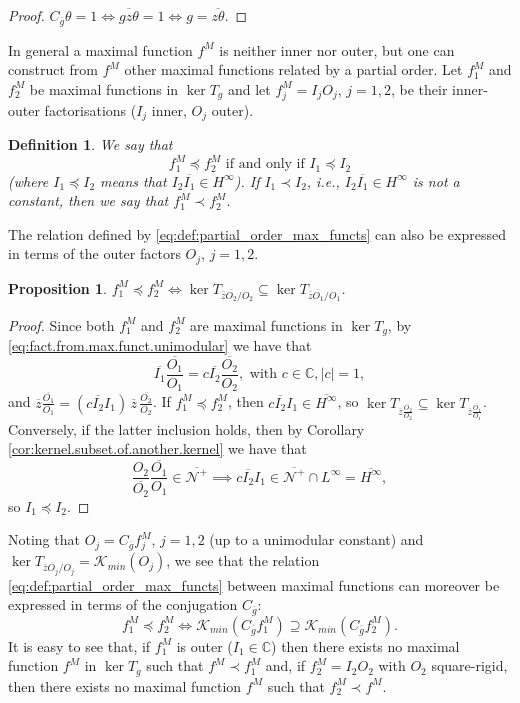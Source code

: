 \documentclass[12pt]{elsarticle}
\numberwithin{equation}{section}
\theoremstyle{plain}
\newtheorem{prop}[thm]{Proposition}
\newtheorem{df}[thm]{Definition}
\newcommand{\Linf}{\ensuremath{L^\infty}}
\newcommand{\Hinf}{\ensuremath{H^\infty}}
\newcommand{\CC}{\ensuremath{\mathbb{C}}}
\newcommand{\KKmin}{\ensuremath{\mathcal{K}_{min}}}
\newcommand{\NN}{\ensuremath{\mathcal{N}^+}}
\newcommand{\Cg}{\ensuremath{C_{\ol g}}}
\newcommand{\ol}[1]{\ensuremath{\overline{#1}}}
\renewcommand{\subset}{\subseteq}
\renewcommand{\supset}{\supseteq}
\begin{document}
\begin{proof}
$\Cg \theta = 1 \iff \ol{gz\theta} = 1 \iff g=\ol{z\theta}$.
\end{proof}



In general a maximal function $f^M$ is neither inner nor outer, but one can construct from $f^M$ other maximal functions related by a partial order.
Let $f_1^M$ and $f^M_2$ be maximal functions in $\ker T_g$ and let $f_j^M = I_j O_j$, $j=1,2$, be their inner-outer factorisations ($I_j$ inner, $O_j$ outer).


\begin{df}
\label{def:partial_order_max_functs}
We say that 
\begin{equation}
\label{eq:def:partial_order_max_functs}
f_1^M \preceq f^M_2 \text{ if and only if } I_1 \preceq I_2
\end{equation}
(where $I_1 \preceq I_2$ means that $I_2 \ol{I_1} \in \Hinf$).
If $I_1 \prec I_2$, i.e., $I_2 \ol{I_1} \in \Hinf$ is not a constant, then we say that $f_1^M \prec f^M_2$.
\end{df}


The relation defined by \eqref{eq:def:partial_order_max_functs} can also be expressed in terms of the outer factors $O_j$, $j=1,2$.

\begin{prop}
\label{prop:partial_order_outer_kernels}
$f_1^M \preceq f_2^M \iff \ker T_{\ol z \ol{O_2} / O_2} \subset \ker T_{\ol z \ol{O_1} / O_1}$.
\end{prop}

\begin{proof}
Since both $f_1^M$ and $f_2^M$ are maximal functions in $\ker T_g$, by \eqref{eq:fact.from.max.funct.unimodular} we have that
\[
\ol{I_1} \frac{\ol{O_1}}{O_1} = c \ol{I_2} \frac{\ol{O_2}}{O_2}, \text{ with } c\in\CC, |c|=1,
\]
and $\ol z \frac{\ol{O_1}}{O_1} = (c \ol{I_2} I_1)\, \ol z \, \frac{\ol{O_2}}{O_2}$.
If $f_1^M \preceq f_2^M$, then $c \ol{I_2} I_1 \in \ol\Hinf$, so $\ker T_{\ol z \frac{\ol{O_2}}{O_2}} \subset \ker T_{\ol z \frac{\ol{O_1}}{O_1}}$.
Conversely, if the latter inclusion holds, then by Corollary \ref{cor:kernel.subset.of.another.kernel} we have that
\[
\frac{O_2}{\ol{O_2}} \frac{\ol{O_1}}{O_1} \in \ol\NN \implies c \ol{I_2} I_1 \in \ol\NN\cap\Linf = \ol\Hinf,
\]
so $I_1 \preceq I_2$.
\end{proof}


Noting that $O_j = \Cg f_j^M$, $j=1,2$ (up to a unimodular constant) and $\ker T_{\ol z \ol{O_j} / O_j} = \KKmin (O_j)$, we see that the relation \eqref{eq:def:partial_order_max_functs} between maximal functions can moreover be expressed in terms of the conjugation \Cg:
\begin{equation*}
\label{eq:partial_order_minimal_kernel}
f_1^M \preceq f_2^M \iff \KKmin(\Cg f_1^M) \supset \KKmin(\Cg f_2^M).
\end{equation*}
It is easy to see that, if $f_1^M$ is outer ($I_1\in\CC$) then there exists no maximal function $f^M$ in $\ker T_g$ such that $f^M \prec f_1^M$ and, if $f_2^M = I_2 O_2$ with $O_2$ square-rigid, then there exists no maximal function $f^M$ such that $f_2^M \prec f^M$.
\end{document}
